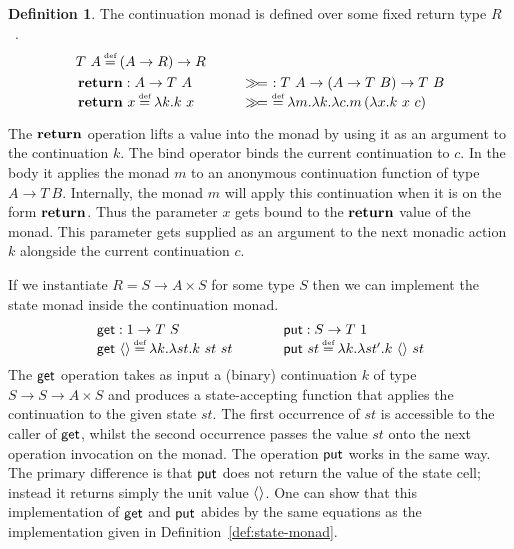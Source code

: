 \documentclass[12pt,phd,lfcs,twoside,openright,logo,leftchapter,normalheadings]{infthesis}
\theoremstyle{plain}
\theoremstyle{definition}
\newtheorem{definition}[theorem]{Definition}
\begin{document}
\begin{definition}\label{def:cont-monad}
  The continuation monad is defined over some fixed return type
  $R$~\cite{Wadler92}.
  \[
    \ba{@{~}l@{\qquad\quad}@{~}r}
      \multicolumn{2}{l}{T~A \defas (A \to R) \to R} \smallskip\\
      \multirow{2}{*}{
        \bl
         \Return : A \to T~A\\
         \Return~x\defas \lambda k.k~x
        \el} &
      \multirow{2}{*}{
        \bl
          \bind ~: T~A \to (A \to T~B) \to T~B\\
          \bind ~\defas \lambda m.\lambda k.\lambda c.m\,(\lambda x.k~x~c)
          \el} \\ & %
    \ea
  \]
\end{definition}
%
The $\mathbf{return}$ operation lifts a value into the monad by using it as an
argument to the continuation $k$. The bind operator binds the current
continuation to $c$. In the body it applies the monad $m$ to an
anonymous continuation function of type $A \to T~B$. Internally, the
monad $m$ will apply this continuation when it is on the form
$\mathbf{return}$. Thus the parameter $x$ gets bound to the $\mathbf{return}$ value of
the monad. This parameter gets supplied as an argument to the next
monadic action $k$ alongside the current continuation $c$.

If we instantiate $R = S \to A \times S$ for some type $S$ then we
can implement the state monad inside the continuation monad.
%
\[
  \ba{@{~}l@{\qquad\quad}@{~}r}
    \multirow{2}{*}{
      \bl
        \getF : \UnitType \to T~S\\
        \getF~\Unit \defas \lambda k.\lambda st.k~st~st
      \el} &
    \multirow{2}{*}{
      \bl
        \putF : S \to T~\UnitType\\
        \putF~st \defas \lambda k.\lambda st'.k~\Unit~st
      \el} \\ & %
  \ea
\]
%
The $\mathsf{get}$ operation takes as input a (binary) continuation $k$ of
type $S \to S \to A \times S$ and produces a state-accepting function
that applies the continuation to the given state $st$. The first
occurrence of $st$ is accessible to the caller of $\mathsf{get}$, whilst the
second occurrence passes the value $st$ onto the next operation
invocation on the monad. The operation $\mathsf{put}$ works in the same
way. The primary difference is that $\mathsf{put}$ does not return the value
of the state cell; instead it returns simply the unit value $\langle  \rangle$.
%
One can show that this implementation of $\mathsf{get}$ and $\mathsf{put}$ abides by
the same equations as the implementation given in
Definition~\ref{def:state-monad}.
\end{document}
